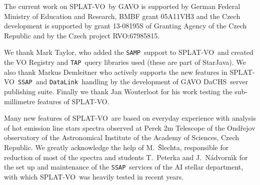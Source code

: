 \documentclass[final,authoryear,5p,times,twocolumn]{elsarticle}
\newcommand{\datalink}{\texttt{DataLink}}
\newcommand{\ssap}{\texttt{SSAP}}
\newcommand{\tap}{\texttt{TAP}}
\newcommand{\samp}{\texttt{SAMP}}
\newcommand{\splatvo}{{\textsf{\small{SPLAT-VO}}}}
\newcommand{\dachs}{\textsf{\small DaCHS}}
\begin{document}
The current work on \splatvo\ by GAVO is supported by German Federal Ministry
of Education and Research, BMBF grant 05A11VH3 and the Czech development is
supported by grant 13-08195S of Granting Agency of the Czech Republic and by
the Czech project RVO:67985815.

We thank Mark Taylor, who added the \samp\ support to \splatvo\ and created the
VO Registry and \tap\ query libraries used (these are part of StarJava).  We
also thank Markus Demleitner who actively supports the new features in
\splatvo\ \ssap\ and \datalink\ handling by the development of GAVO \dachs\
server publishing suite.  Finally we thank Jan Wouterloot for his work testing
the sub-millimetre features of \splatvo.

Many new features of \splatvo\ are based on everyday experience with analysis
of hot emission line stars spectra observed at Perek 2m Telescope of the
Ond\v{r}ejov observatory of the Astronomical Institute of the Academy of
Sciences, Czech Republic. We greatly acknowledge the help of M.~\v{S}lechta,
responsible for reduction of most of the spectra and students T.~Peterka and
J.~N\'advorn\'\i{}k for the set up and maintenance of the \ssap\ services of
the AI stellar department, with which \splatvo\ was heavily tested in recent
years.



\end{document}
